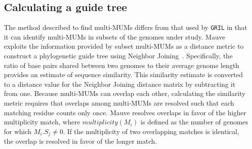 \documentclass[titlepage,11pt]{article}
\begin{document}

\subsection*{Calculating a guide tree}
The method described to find multi-MUMs differs from that used by \texttt{GRIL} in that
it can identify multi-MUMs in subsets of the genomes under study.  Mauve
exploits the information provided by subset multi-MUMs as a distance metric to
construct a phylogenetic guide tree using Neighbor Joining~\citep{njoining}.
Specifically, the ratio of base pairs shared between two genomes to their average
genome length provides an estimate of sequence similarity.  This similarity
estimate is converted to a distance value for the Neighbor Joining distance
matrix by subtracting it from one.
Because multi-MUMs can overlap each other, calculating the similarity metric
requires that overlaps among multi-MUMs are resolved such that each matching
residue counts only once.  Mauve resolves overlaps in favor of the higher
multiplicity match, where $multiplicity(M_i)$ is defined as the number of genomes for
which $M_i.S_j \neq 0$.  If the multiplicity of two overlapping matches is
identical, the overlap is resolved in favor of the longer match.

\end{document}
